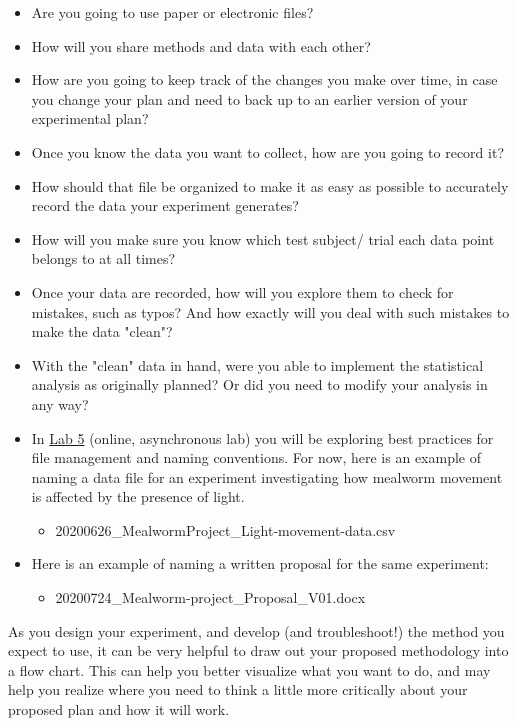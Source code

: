 \documentclass[
]{book}
\providecommand{\tightlist}{%
  \setlength{\itemsep}{0pt}\setlength{\parskip}{0pt}}
\begin{document}
\begin{itemize}
\tightlist
\item
  Are you going to use paper or electronic files?
\item
  How will you share methods and data with each other?
\item
  How are you going to keep track of the changes you make over time, in case you change your plan and need to back up to an earlier version of your experimental plan?
\item
  Once you know the data you want to collect, how are you going to record it?
\item
  How should that file be organized to make it as easy as possible to accurately record the data your experiment generates?
\item
  How will you make sure you know which test subject/ trial each data point belongs to at all times?
\item
  Once your data are recorded, how will you explore them to check for mistakes, such as typos? And how exactly will you deal with such mistakes to make the data "clean"?
\item
  With the "clean" data in hand, were you able to implement the statistical analysis as originally planned? Or did you need to modify your analysis in any way?
\item
  In \href{https://ubco-biology.github.io/BIOL-116-Lab-Manual/naming-conventions.html}{Lab 5} (online, asynchronous lab) you will be exploring best practices for file management and naming conventions. For now, here is an example of naming a data file for an experiment investigating how mealworm movement is affected by the presence of light.

  \begin{itemize}
  \tightlist
  \item
    20200626\_MealwormProject\_Light-movement-data.csv
  \end{itemize}
\item
  Here is an example of naming a written proposal for the same experiment:

  \begin{itemize}
  \tightlist
  \item
    20200724\_Mealworm-project\_Proposal\_V01.docx
  \end{itemize}
\end{itemize}

As you design your experiment, and develop (and troubleshoot!) the method you expect to use, it can be very helpful to draw out your proposed methodology into a flow chart. This can help you better visualize what you want to do, and may help you realize where you need to think a little more critically about your proposed plan and how it will work.
\end{document}
